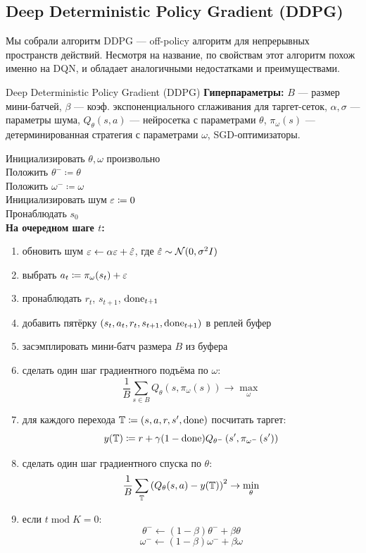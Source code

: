 \subsection{Deep Deterministic Policy Gradient (DDPG)}

Мы собрали алгоритм DDPG --- off-policy алгоритм для непрерывных пространств действий. Несмотря на название, по свойствам этот алгоритм похож именно на DQN, и обладает аналогичными недостатками и преимуществами.

\begin{algorithm}[label = DDPGalgorithm]{Deep Deterministic Policy Gradient (DDPG)}
\textbf{Гиперпараметры:} $B$ --- размер мини-батчей, $\beta$ --- коэф. экспоненциального сглаживания для таргет-сеток, $\alpha, \sigma$ --- параметры шума, $Q_{\theta}(s, a)$ --- нейросетка с параметрами $\theta$, $\pi_{\omega}(s)$ --- детерминированная стратегия с параметрами $\omega$, SGD-оптимизаторы.

\vspace{0.3cm}
Инициализировать $\theta, \omega$ произвольно \\
Положить $\theta^- \coloneqq \theta$ \\
Положить $\omega^- \coloneqq \omega$ \\
Инициализировать шум $\varepsilon \coloneqq 0$ \\
Пронаблюдать $s_0$ \\
\textbf{На очередном шаге $t$:}
\begin{enumerate}
    \item обновить шум $\varepsilon \leftarrow \alpha \varepsilon + \hat{\varepsilon}$, где $\hat{\varepsilon} \sim \mathcal{N}(0, \sigma^2 I)$
    \item выбрать $a_t \coloneqq \pi_\omega(s_t) + \varepsilon$
    \item пронаблюдать $r_t$,  $s_{t+1}$, $\mathrm{done}_{t+1}$
    \item добавить пятёрку $(s_t, a_t, r_t, s_{t+1}, \mathrm{done}_{t+1})$ в реплей буфер
    \item засэмплировать мини-батч размера $B$ из буфера
    \item сделать один шаг градиентного подъёма по $\omega$:
    $$\frac{1}{B}\sum_{s \in B} Q_{\theta}(s, \pi_\omega(s)) \to \max_{\omega}$$
    \item для каждого перехода $\mathbb{T} \coloneqq (s, a, r, s', \mathrm{done})$ посчитать таргет:
    $$y(\mathbb{T} ) \coloneqq r + \gamma (1 - \mathrm{done}) Q_{\theta^{-}} \left( s', \pi_{\omega^{-}} \left( s' \right) \right)$$
    \item сделать один шаг градиентного спуска по $\theta$:
    $$\frac{1}{B}\sum_{\mathbb{T}} \left( Q_{\theta}(s, a) - y(\mathbb{T} ) \right) ^2 \to \min_\theta$$
    \item если $t \operatorname{mod} K = 0$: 
        $$\theta^{-} \gets (1 - \beta) \theta^{-} + \beta \theta$$
        $$\omega^{-} \gets (1 - \beta) \omega^{-} + \beta \omega$$
\end{enumerate}
\end{algorithm}

